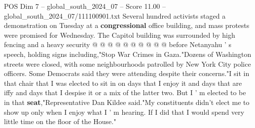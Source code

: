 \begin{textsample}{POS Dim 7 – global\_south\_2024\_07 – Score 11.00 – global\_south\_2024\_07/111100901.txt}
Several hundred activists staged a demonstration on Tuesday at a \textbf{congressional} office building, and mass protests were promised for Wednesday.
The Capitol building was surrounded by high fencing and a heavy security @ @ @ @ @ @ @ @ @ @ before Netanyahu ' s speech, holding signs including,"Stop War Crimes in Gaza."Dozens of Washington streets were closed, with some neighbourhoods patrolled by New York City police officers.
Some Democrats said they were attending despite their concerns."I sit in that chair that I was elected to sit in on days that I enjoy it and days that are iffy and days that I despise it or a mix of the latter two.
But I ' m elected to be in that \textbf{seat},"Representative Dan Kildee said."My constituents didn't elect me to show up only when I enjoy what I ' m hearing.
If I did that I would spend very little time on the floor of the House."

\end{textsample}
